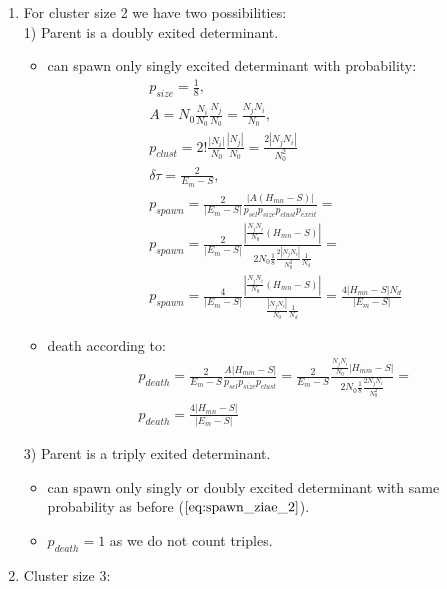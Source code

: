 \documentclass[twoside,english]{uiofysmaster}
\theoremstyle{definition}
\begin{document}
\begin{enumerate}
	\item For cluster size 2 we have two possibilities:\\
	1) Parent is a doubly exited determinant.
	\begin{itemize}
		\item can spawn only singly excited determinant with probability:
		\begin{align}
		p_{size} = \frac{1}{8},\\
		A = N_0\frac{N_i}{N_0}\frac{N_j}{N_0}=\frac{N_jN_i}{N_0},\\
		p_{clust}=2!\frac{|N_i|}{N_0}\frac{|N_j|}{N_0}=\frac{2|N_jN_i|}{N_0^2}\\
		\delta \tau = \frac{2}{E_m  - S},\\
		p_{spawn} = \frac{2}{|E_m - S|} \frac{|A(H_{mn}-S)|}{ p_{sel}  p_{size} p_{clust} p_{excit}  }=\\
		p_{spawn} = \frac{2}{|E_m - S|} \frac{  | \frac{N_jN_i}{N_0} (H_{mn}-S)|}{2N_0 \frac{1}{8} \frac{2|N_jN_i|}{N_0^2} \frac{1}{N_d} }=\\
		p_{spawn} = \frac{4}{|E_m - S|} \frac{ |\frac{N_jN_i}{N_0} (H_{mn}-S)|}{ \frac{|N_jN_i|}{N_0} \frac{1}{N_d} }=\frac{4|H_{mn}-S|N_d}{|E_m - S|}\label{eq:spawn_ziae_2}
		\end{align}
		\item death according to:
		\begin{align}
		p_{death} = \frac{2}{E_m - S} \frac{A|H_{mm}-S|}{ p_{sel}  p_{size} p_{clust} }=
		\frac{2}{E_m - S} \frac{\frac{N_jN_i}{N_0}|H_{mm}-S|}{ 2N_0 \frac{1}{8} \frac{2N_jN_i}{N_0^2} }=\\
		p_{death} =  \frac{4|H_{mn}-S|}{|E_m - S|}
		\end{align}
	\end{itemize}
	3) Parent is a triply exited determinant.
	\begin{itemize}
		\item can spawn only singly or doubly excited determinant with same probability as before ($\ref{eq:spawn_ziae_2}$).
		\item $p_{death} = 1$ as we do not count triples.
	\end{itemize}
	
	\item Cluster size 3:
	

\end{enumerate}
\end{document}
